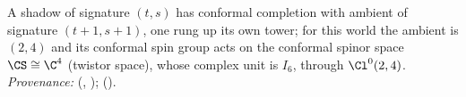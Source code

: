 A shadow of signature $(t,s)$ has conformal completion with ambient of signature $(t+1, s+1)$, one rung up its own tower; for this world the ambient is $(2,4)$ and its conformal spin group acts on the conformal spinor space $\CS \cong \C^{4}$ (twistor space), whose complex unit is $I_6$, through $\Cl^{0}(2,4)$. \emph{Provenance:} \cite[Fact~2.1, Thm.~3.4]{ButlerT9} (, ); \cite[Fact~2.11]{ButlerT12} ().
